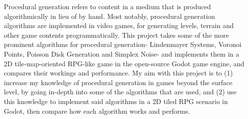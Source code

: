 Procedural generation refers to content in a medium that is produced algorithmically in lieu of by hand. Most notably, procedural generation algorithms are implemented in video games, for generating levels, terrain and other game contents programmatically. This project takes some of the more prominent algorithms for procedural generation- Lindenmayer Systems, Voronoi Points, Poisson Disk Generation and Simplex Noise- and implements them in a 2D tile-map-oriented RPG-like game in the open-source Godot game engine, and compares their workings and performance. My aim with this project is to (1) increase my knowledge of procedural generation in games beyond the surface level, by going in-depth into some of the algorithms that are used, and (2) use this knowledge to implement said algorithms in a 2D tiled RPG scenario in Godot, then compare how each algorithm works and performs.